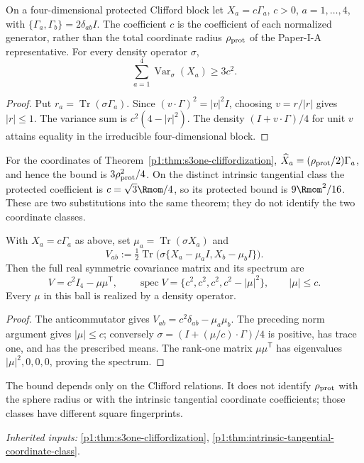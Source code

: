 \documentclass[11pt]{article}
\begin{document}
On a four-dimensional protected Clifford block let $X_a=c\Gamma_a$,
$c>0$, $a=1,\ldots,4$, with
$\{\Gamma_a,\Gamma_b\}=2\delta_{ab}I$.  The coefficient $c$
is the coefficient of each normalized generator, rather than the total
coordinate radius $\rho_{\rm prot}$ of the Paper-I-A representative.
For every density operator $\sigma$,
\[
 \boxed{\sum_{a=1}^4\operatorname{Var}_\sigma(X_a)
 \ge3c^2.}
\]
\begin{proof}
Put $r_a=\operatorname{Tr}(\sigma\Gamma_a)$. Since
$(v\cdot\Gamma)^2=|v|^2I$, choosing $v=r/|r|$ gives $|r|\le1$.
The variance sum is $c^2(4-|r|^2)$. The density
$(I+v\cdot\Gamma)/4$ for unit $v$ attains equality in the irreducible
four-dimensional block.
\end{proof}
For the coordinates of Theorem~\ref{p1:thm:s3one-cliffordization},
$\widehat X_a=(\rho_{\rm prot}/2)\Gamma_a$, and hence the bound is
$3\rho_{\rm prot}^2/4$.  On the distinct intrinsic tangential class the
protected coefficient is $c=\sqrt3\Rmom/4$, so its protected bound is
$9\Rmom^2/16$.  These are two substitutions into the same theorem;
they do not identify the two coordinate classes.

\begin{proposition}
\label{p1:prop:protected-coordinate-covariance}
With $X_a=c\Gamma_a$ as above, set
$\mu_a=\operatorname{Tr}(\sigma X_a)$ and
\[
 V_{ab}:=\tfrac12\operatorname{Tr}
 \bigl(\sigma\{X_a-\mu_aI,X_b-\mu_bI\}\bigr).
\]
Then the full real symmetric covariance matrix and its spectrum are
\[
 \boxed{V=c^2I_4-\mu\mu^{\mathsf T}},\qquad
 \operatorname{spec}V=\{c^2,c^2,c^2,c^2-|\mu|^2\},\qquad |\mu|\le c.
\]
Every $\mu$ in this ball is realized by a density operator.
\end{proposition}
\begin{proof}
The anticommutator gives $V_{ab}=c^2\delta_{ab}-\mu_a\mu_b$.
The preceding norm argument gives $|\mu|\le c$; conversely
$\sigma=(I+(\mu/c)\cdot\Gamma)/4$ is positive, has trace one, and has
the prescribed means.  The rank-one matrix $\mu\mu^{\mathsf T}$ has
eigenvalues $|\mu|^2,0,0,0$, proving the spectrum.
\end{proof}
The bound depends only on the Clifford relations. It does not identify
$\rho_{\rm prot}$ with the sphere radius or with the intrinsic tangential
coordinate coefficients; those classes have different square fingerprints.
\par\noindent\textit{Inherited inputs:} \ref{p1:thm:s3one-cliffordization}, \ref{p1:thm:intrinsic-tangential-coordinate-class}.
\end{document}
